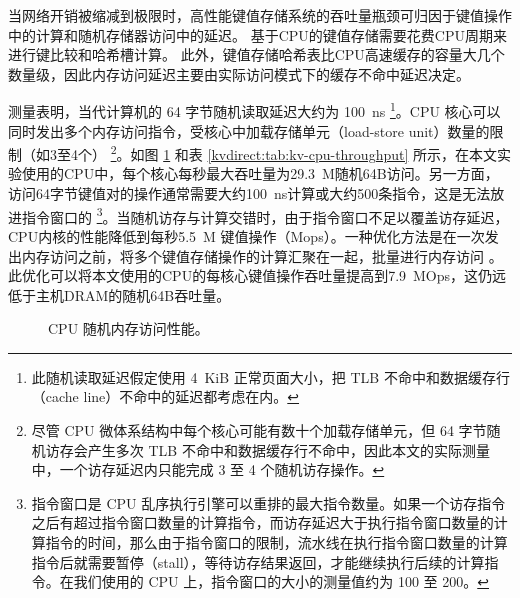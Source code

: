 当网络开销被缩减到极限时，高性能键值存储系统的吞吐量瓶颈可归因于键值操作中的计算和随机存储器访问中的延迟。
基于CPU的键值存储需要花费CPU周期来进行键比较和哈希槽计算。
此外，键值存储哈希表比CPU高速缓存的容量大几个数量级，因此内存访问延迟主要由实际访问模式下的缓存不命中延迟决定。


测量表明，当代计算机的 64 字节随机读取延迟大约为 100~ns \footnote{此随机读取延迟假定使用 4~KiB 正常页面大小，把 TLB 不命中和数据缓存行（cache line）不命中的延迟都考虑在内。}。CPU 核心可以同时发出多个内存访问指令，受核心中加载存储单元（load-store unit）数量的限制（如3至4个） \cite {gharachorloo1992hiding,han2010packetshader,zhang2015mega} \footnote{尽管 CPU 微体系结构中每个核心可能有数十个加载存储单元，但 64 字节随机访存会产生多次 TLB 不命中和数据缓存行不命中，因此本文的实际测量中，一个访存延迟内只能完成 3 至 4 个随机访存操作。}。如图 \ref{kvdirect:fig:cpu-mem} 和表 \ref{kvdirect:tab:kv-cpu-throughput} 所示，在本文实验使用的CPU中，每个核心每秒最大吞吐量为29.3~M随机64B访问。另一方面，访问64字节键值对的操作通常需要大约100~ns计算或大约500条指令，这是无法放进指令窗口的 \footnote{指令窗口是 CPU 乱序执行引擎可以重排的最大指令数量。如果一个访存指令之后有超过指令窗口数量的计算指令，而访存延迟大于执行指令窗口数量的计算指令的时间，那么由于指令窗口的限制，流水线在执行指令窗口数量的计算指令后就需要暂停（stall），等待访存结果返回，才能继续执行后续的计算指令。在我们使用的 CPU 上，指令窗口的大小的测量值约为 100 至 200。}。当随机访存与计算交错时，由于指令窗口不足以覆盖访存延迟，CPU内核的性能降低到每秒5.5~M 键值操作（Mops）。一种优化方法是在一次发出内存访问之前，将多个键值存储操作的计算汇聚在一起，批量进行内存访问 \cite {li2016full,narula2014phase}。此优化可以将本文使用的CPU的每核心键值操作吞吐量提高到7.9~MOps，这仍远低于主机DRAM的随机64B吞吐量。


\begin{figure}[htbp]
	\centering
	\caption{CPU 随机内存访问性能。}
	\label{kvdirect:fig:cpu-mem}
\end{figure}


